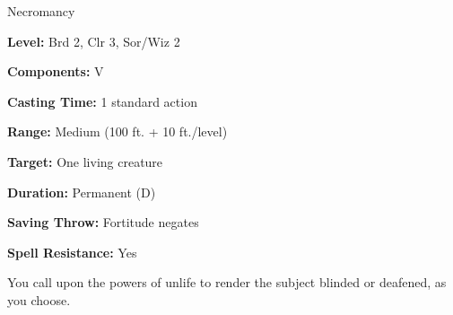 \label{spell:Blindness}\label{spell:Deafness}

Necromancy

\textbf{Level:} Brd 2, Clr 3, Sor/Wiz 2

\textbf{Components:} V

\textbf{Casting Time:} 1 standard action

\textbf{Range:} Medium (100 ft. + 10 ft./level)

\textbf{Target:} One living creature

\textbf{Duration:} Permanent (D)

\textbf{Saving Throw:} Fortitude negates

\textbf{Spell Resistance:} Yes

You call upon the powers of unlife to render the subject blinded or deafened, as 
you choose.

